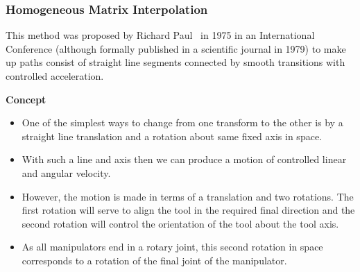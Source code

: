 \documentclass[10pt, aspectratio=169]{beamer}
\theoremstyle{remark}
\theoremstyle{definition}
\begin{document}
\begin{frame}[allowframebreaks]
\frametitle{Homogeneous Matrix Interpolation}

This method was proposed by Richard Paul~\cite{paul1979manipulator} in 1975 in an International Conference (although formally published in a scientific journal in 1979) to make up paths consist of straight line segments connected by smooth transitions with controlled acceleration.

\textcolor{uma_blue_dark}{\textbf{Concept}}
\begin{itemize}
    \item One of the simplest ways to change from one transform to the other is by a straight line translation and a rotation about same fixed axis in space.
    \item With such a line and axis then we can produce a motion of controlled linear and angular velocity.
    \item  However, the motion is made in terms of a translation and two rotations. The first rotation will serve to align the tool in the required final direction and the second rotation will control the orientation of the tool about the tool axis.
    \item As all manipulators end in a rotary joint, this second rotation in space corresponds to a rotation of the final joint of the manipulator. 
\end{itemize}

\framebreak



\end{frame}
\end{document}
